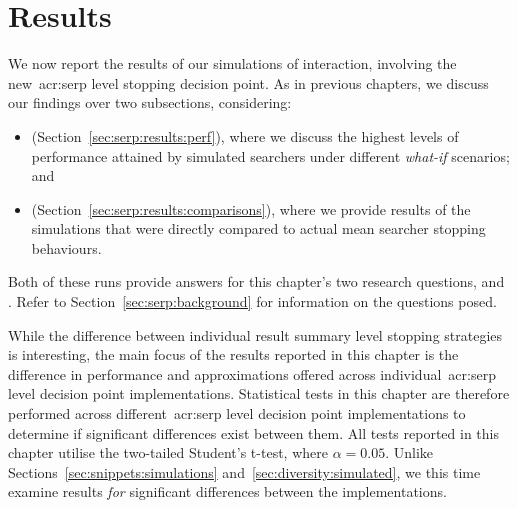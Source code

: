 %

\section{Results}\label{sec:serp:results}
We now report the results of our simulations of interaction, involving the new~\gls{acr:serp} level stopping decision point. As in previous chapters, we discuss our findings over two subsections, considering:

\begin{itemize}
    \item{ (Section~\ref{sec:serp:results:perf}), where we discuss the highest levels of performance attained by simulated searchers under different \emph{what-if} scenarios; and}
    \item{ (Section~\ref{sec:serp:results:comparisons}), where we provide results of the simulations that were directly compared to actual mean searcher stopping behaviours.}
\end{itemize}

Both of these runs provide answers for this chapter's two research questions,  and . Refer to Section~\ref{sec:serp:background} for information on the questions posed.

While the difference between individual result summary level stopping strategies is interesting, the main focus of the results reported in this chapter is the difference in performance and approximations offered across individual~\gls{acr:serp} level decision point implementations. Statistical tests in this chapter are therefore performed across different~\gls{acr:serp} level decision point implementations to determine if significant differences exist between them. All tests reported in this chapter utilise the two-tailed Student's t-test, where $\alpha=0.05$. Unlike Sections~\ref{sec:snippets:simulations} and~\ref{sec:diversity:simulated}, we this time examine results \emph{for} significant differences between the implementations.

